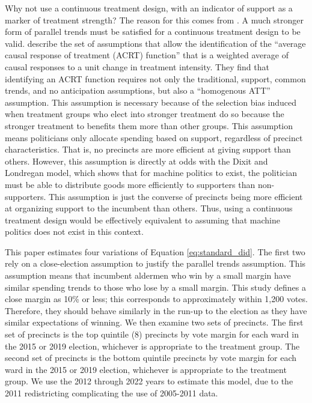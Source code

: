 Why not use a continuous treatment design, with an indicator of support as a marker of treatment strength?
The reason for this comes from \cite{callaway2021_continuous}. 
A much stronger form of parallel trends must be satisfied for a continuous treatment design to be valid.
\cite{callaway2021_continuous} describe the set of assumptions that allow the identification of the  ``average causal response of treatment (ACRT) function'' that is a weighted average of causal responses to a unit change in treatment intensity.
They find that identifying an ACRT function requires not only the traditional, support, common trends, and no anticipation assumptions, but also a ``homogenous ATT'' assumption. 
This assumption is necessary because of the selection bias induced when treatment groups who elect into stronger treatment do so because the stronger treatment to benefits them more than other groups.
This assumption means politicians only allocate spending based on support, regardless of precinct characteristics.
That is, no precincts are more efficient at giving support than others.
However, this assumption is directly at odds with the Dixit and Londregan model, which shows that for machine politics to exist, the politician must be able to distribute goods more efficiently to supporters than non-supporters. 
This assumption is just the converse of precincts being more efficient at organizing support to the incumbent than others.
Thus, using a continuous treatment design would be effectively equivalent to assuming that machine politics does not exist in this context.


This paper estimates four variations of Equation \ref{eq:standard_did}. 
The first two rely on a close-election assumption to justify the parallel trends assumption. 
This assumption means that incumbent aldermen who win by a small margin have similar spending trends to those who lose by a small margin.
This study defines a close margin as 10\% or less; this corresponds to approximately within 1,200 votes.
Therefore, they should behave similarly in the run-up to the election as they have similar expectations of winning.
We then examine two sets of precincts. 
The first set of precincts is the top quintile (8) precincts by vote margin for each ward in the 2015 or 2019 election, whichever is appropriate to the treatment group. 
The second set of precincts is the bottom quintile precincts by vote margin for each ward in the 2015 or 2019 election, whichever is appropriate to the treatment group.
We use the 2012 through 2022 years to estimate this model, due to the 2011 redistricting complicating the use of 2005-2011 data. 

